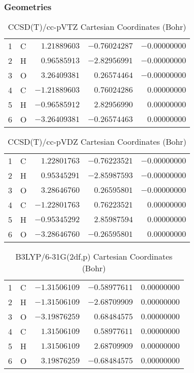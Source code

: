 \documentclass[10pt,oneside]{article}
\begin{document}
\clearpage

\subsection{\ \ \ }

\subsubsection*{Geometries}
\begin{table}[h!]
\centering
\caption{CCSD(T)/cc-pVTZ Cartesian Coordinates (Bohr)}
\begin{tabular}{llrrr}
1  & C  & $ 1.21889603$ & $-0.76024287$ & $-0.00000000$ \\
2  & H  & $ 0.96585913$ & $-2.82956991$ & $-0.00000000$ \\
3  & O  & $ 3.26409381$ & $ 0.26574464$ & $-0.00000000$ \\
4  & C  & $-1.21889603$ & $ 0.76024286$ & $ 0.00000000$ \\
5  & H  & $-0.96585912$ & $ 2.82956990$ & $ 0.00000000$ \\
6  & O  & $-3.26409381$ & $-0.26574463$ & $ 0.00000000$ \\
\end{tabular}
\end{table}

\begin{table}[h!]
\centering
\caption{CCSD(T)/cc-pVDZ Cartesian Coordinates (Bohr)}
\begin{tabular}{llrrr}
1  & C  & $ 1.22801763$ & $-0.76223521$ & $-0.00000000$ \\
2  & H  & $ 0.95345291$ & $-2.85987593$ & $-0.00000000$ \\
3  & O  & $ 3.28646760$ & $ 0.26595801$ & $-0.00000000$ \\
4  & C  & $-1.22801763$ & $ 0.76223521$ & $ 0.00000000$ \\
5  & H  & $-0.95345292$ & $ 2.85987594$ & $ 0.00000000$ \\
6  & O  & $-3.28646760$ & $-0.26595801$ & $ 0.00000000$ \\
\end{tabular}
\end{table}

\begin{table}[h!]
\centering
\caption{B3LYP/6-31G(2df,p) Cartesian Coordinates (Bohr)}
\begin{tabular}{llrrr}
1  & C  & $-1.31506109$ & $-0.58977611$ & $ 0.00000000$ \\
2  & H  & $-1.31506109$ & $-2.68709909$ & $ 0.00000000$ \\
3  & O  & $-3.19876259$ & $ 0.68484575$ & $ 0.00000000$ \\
4  & C  & $ 1.31506109$ & $ 0.58977611$ & $ 0.00000000$ \\
5  & H  & $ 1.31506109$ & $ 2.68709909$ & $ 0.00000000$ \\
6  & O  & $ 3.19876259$ & $-0.68484575$ & $ 0.00000000$ \\
\end{tabular}
\end{table}
\end{document}
